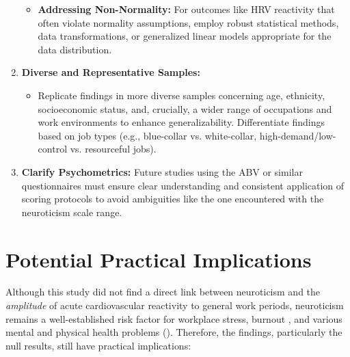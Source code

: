 \documentclass[11pt, a4paper]{report}
\newcommand{\pdfcite}[2]{\cite{#1} (\href{run:./papers/#2.pdf}{\texttt{\detokenize{#2.pdf}}})}
\begin{document}
\begin{enumerate}
\begin{itemize}
            \item \textbf{Addressing Non-Normality:} For outcomes like HRV reactivity that often violate normality assumptions, employ robust statistical methods, data transformations, or generalized linear models appropriate for the data distribution.
        \end{itemize}
    \item \textbf{Diverse and Representative Samples:}
        \begin{itemize}
            \item Replicate findings in more diverse samples concerning age, ethnicity, socioeconomic status, and, crucially, a wider range of occupations and work environments to enhance generalizability. Differentiate findings based on job types (e.g., blue-collar vs. white-collar, high-demand/low-control vs. resourceful jobs).
        \end{itemize}
    \item \textbf{Clarify Psychometrics:} Future studies using the ABV or similar questionnaires must ensure clear understanding and consistent application of scoring protocols to avoid ambiguities like the one encountered with the neuroticism scale range.
\end{enumerate}

\section{Potential Practical Implications}
\label{sec:recommendations_practice_main} %

Although this study did not find a direct link between neuroticism and the \textit{amplitude} of acute cardiovascular reactivity to general work periods, neuroticism remains a well-established risk factor for workplace stress, burnout \cite{Bianchi2018}, and various mental and physical health problems \pdfcite{Barlow_OriginsNeuroticism}{The_origins_of_neuroticism}. Therefore, the findings, particularly the null results, still have practical implications:
\end{document}
